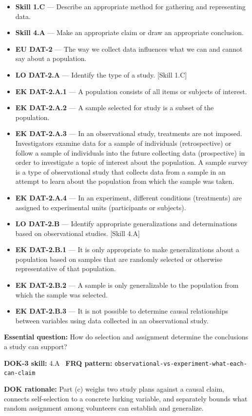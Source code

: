 \documentclass[11pt]{article}
\begin{document}


{\small
\begin{itemize}[leftmargin=1.5em,itemsep=2pt,topsep=2pt]
  \item \textbf{Skill 1.C} --- Describe an appropriate method for gathering and representing data.
  \item \textbf{Skill 4.A} --- Make an appropriate claim or draw an appropriate conclusion.
  \item \textbf{EU DAT-2} --- The way we collect data influences what we can and cannot say about a population.
  \item \textbf{LO DAT-2.A} --- Identify the type of a study. [Skill 1.C]
  \item \textbf{EK DAT-2.A.1} --- A population consists of all items or subjects of interest.
  \item \textbf{EK DAT-2.A.2} --- A sample selected for study is a subset of the population.
  \item \textbf{EK DAT-2.A.3} --- In an observational study, treatments are not imposed. Investigators examine data for a sample of individuals (retrospective) or follow a sample of individuals into the future collecting data (prospective) in order to investigate a topic of interest about the population. A sample survey is a type of observational study that collects data from a sample in an attempt to learn about the population from which the sample was taken.
  \item \textbf{EK DAT-2.A.4} --- In an experiment, different conditions (treatments) are assigned to experimental units (participants or subjects).
  \item \textbf{LO DAT-2.B} --- Identify appropriate generalizations and determinations based on observational studies. [Skill 4.A]
  \item \textbf{EK DAT-2.B.1} --- It is only appropriate to make generalizations about a population based on samples that are randomly selected or otherwise representative of that population.
  \item \textbf{EK DAT-2.B.2} --- A sample is only generalizable to the population from which the sample was selected.
  \item \textbf{EK DAT-2.B.3} --- It is not possible to determine causal relationships between variables using data collected in an observational study.
\end{itemize}
}
\textbf{Essential question:} How do selection and assignment determine the conclusions a study can support?\par
\textbf{DOK-3 skill:} 4.A \textperiodcentered\ \textbf{FRQ pattern:} {\small\texttt{observational-\allowbreak{}vs-\allowbreak{}experiment-\allowbreak{}what-\allowbreak{}each-\allowbreak{}can-\allowbreak{}claim}}\par
\textbf{DOK rationale:} Part (c) weighs two study plans against a causal claim, connects self-selection to a concrete lurking variable, and separately bounds what random assignment among volunteers can establish and generalize.\par
\end{document}
